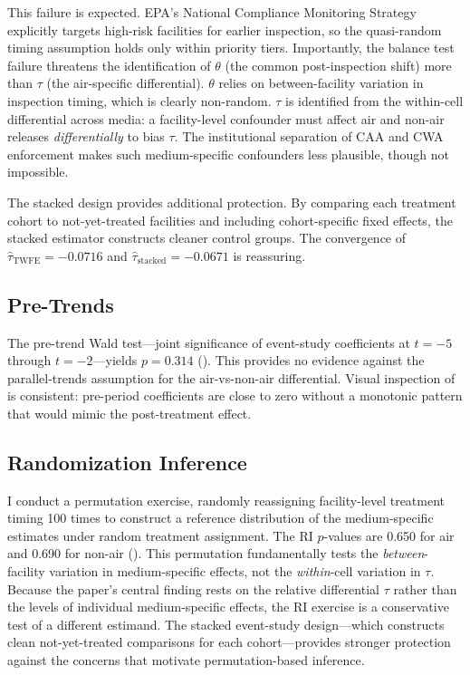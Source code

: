 \documentclass[12pt]{article}
\begin{document}
This failure is expected. EPA's National Compliance Monitoring Strategy explicitly targets high-risk facilities for earlier inspection, so the quasi-random timing assumption holds only within priority tiers. Importantly, the balance test failure threatens the identification of $\theta$ (the common post-inspection shift) more than $\tau$ (the air-specific differential). $\theta$ relies on between-facility variation in inspection timing, which is clearly non-random. $\tau$ is identified from the within-cell differential across media: a facility-level confounder must affect air and non-air releases \textit{differentially} to bias $\tau$. The institutional separation of CAA and CWA enforcement makes such medium-specific confounders less plausible, though not impossible.

The stacked design provides additional protection. By comparing each treatment cohort to not-yet-treated facilities and including cohort-specific fixed effects, the stacked estimator constructs cleaner control groups. The convergence of $\hat{\tau}_{\text{TWFE}} = -0.0716$ and $\hat{\tau}_{\text{stacked}} = -0.0671$ is reassuring.

\subsection{Pre-Trends}

The pre-trend Wald test---joint significance of event-study coefficients at $t = -5$ through $t = -2$---yields $p = 0.314$ (). This provides no evidence against the parallel-trends assumption for the air-vs-non-air differential. Visual inspection of  is consistent: pre-period coefficients are close to zero without a monotonic pattern that would mimic the post-treatment effect.

\subsection{Randomization Inference}

I conduct a permutation exercise, randomly reassigning facility-level treatment timing 100 times to construct a reference distribution of the medium-specific estimates under random treatment assignment. The RI $p$-values are 0.650 for air and 0.690 for non-air (). This permutation fundamentally tests the \textit{between}-facility variation in medium-specific effects, not the \textit{within}-cell variation in $\tau$. Because the paper's central finding rests on the relative differential $\tau$ rather than the levels of individual medium-specific effects, the RI exercise is a conservative test of a different estimand. The stacked event-study design---which constructs clean not-yet-treated comparisons for each cohort---provides stronger protection against the concerns that motivate permutation-based inference.
\end{document}
